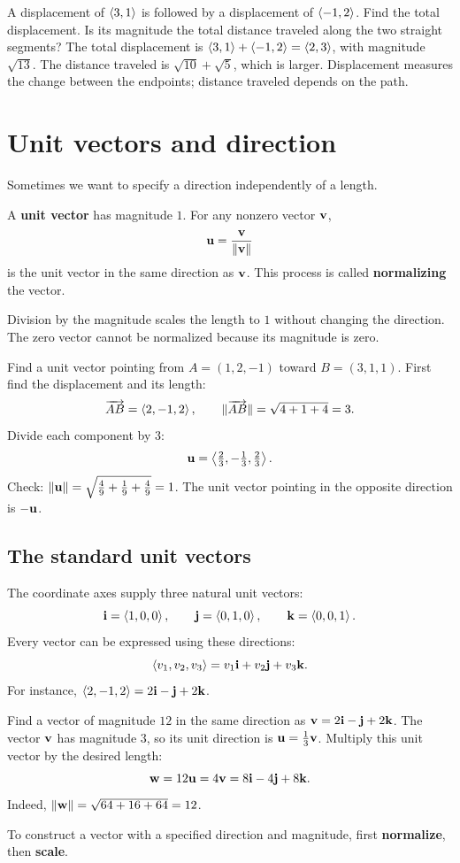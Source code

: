 \documentclass[11pt]{article}
\begin{document}
\begin{example}{A displacement of $\left\langle 3,1\right\rangle$ is followed by a displacement
of $\left\langle -1,2\right\rangle$. Find the total displacement. Is its magnitude the total
distance traveled along the two straight segments?}
The total displacement is $\left\langle 3,1\right\rangle+\left\langle -1,2\right\rangle=\left\langle 2,3\right\rangle$,
with magnitude $\sqrt{13}$. The distance traveled is
$\sqrt{10}+\sqrt{5}$, which is larger. Displacement measures the change
between the endpoints; distance traveled depends on the path.
\end{example}

\newpage
\section{Unit vectors and direction}
Sometimes we want to specify a direction independently of a length.

\begin{definition}
A \textbf{unit vector} has magnitude $1$. For any nonzero vector $\mathbf{v}$,
\[
  \mathbf{u}=\frac{\mathbf{v}}{\lVert\mathbf{v}\rVert}
\]
is the unit vector in the same direction as $\mathbf{v}$. This process is called
\textbf{normalizing} the vector.
\end{definition}

Division by the magnitude scales the length to $1$ without changing the
direction. The zero vector cannot be normalized because its magnitude is zero.

\begin{example}{Find a unit vector pointing from $A=(1,2,-1)$ toward $B=(3,1,1)$.}
First find the displacement and its length:
\[
  \overrightarrow{AB}=\left\langle 2,-1,2\right\rangle,
  \qquad \lVert\overrightarrow{AB}\rVert=\sqrt{4+1+4}=3.
\]
Divide each component by $3$:
\[
  \mathbf{u}=\left\langle \tfrac23,-\tfrac13,\tfrac23\right\rangle.
\]
Check: $\lVert\mathbf{u}\rVert=\sqrt{\frac49+\frac19+\frac49}=1$.
The unit vector pointing in the opposite direction is $-\mathbf{u}$.
\end{example}

\subsection*{The standard unit vectors}
The coordinate axes supply three natural unit vectors:
\[
  \mathbf{i}=\left\langle 1,0,0\right\rangle,\qquad
  \mathbf{j}=\left\langle 0,1,0\right\rangle,\qquad
  \mathbf{k}=\left\langle 0,0,1\right\rangle.
\]
Every vector can be expressed using these directions:
\[
  \left\langle v_1,v_2,v_3\right\rangle=v_1\mathbf{i}+v_2\mathbf{j}+v_3\mathbf{k}.
\]
For instance, $\left\langle 2,-1,2\right\rangle=2\mathbf{i}-\mathbf{j}+2\mathbf{k}$.

\begin{example}{Find a vector of magnitude $12$ in the same direction as
$\mathbf{v}=2\mathbf{i}-\mathbf{j}+2\mathbf{k}$.}
The vector $\mathbf{v}$ has magnitude $3$, so its unit direction is
$\mathbf{u}=\frac13\mathbf{v}$. Multiply this unit vector by the desired length:
\[
  \mathbf{w}=12\mathbf{u}=4\mathbf{v}=8\mathbf{i}-4\mathbf{j}+8\mathbf{k}.
\]
Indeed, $\lVert\mathbf{w}\rVert=\sqrt{64+16+64}=12$.
\end{example}

To construct a vector with a specified direction and magnitude, first
\textbf{normalize}, then \textbf{scale}.
\end{document}
